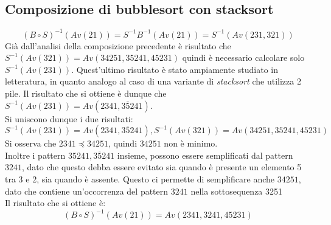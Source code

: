 \subsection{Composizione di {bubblesort} con {stacksort}}
$$(B\circ S)^{-1}(Av(21))=S^{-1}B^{-1}(Av(21))=S^{-1}(Av(231,321))$$
Gi\`a dall'analisi della composizione precedente \`e risultato che $S^{-1}(Av(321))=Av(34251, 35241, 45231)$ quindi \`e necessario calcolare solo $S^{-1}(Av(231))$. Quest'ultimo risultato \`e stato ampiamente studiato in letteratura, in quanto analogo al caso di una variante di \textit{stacksort} che utilizza 2 pile. Il risultato che si ottiene \`e dunque che $S^{-1}(Av(231))=Av(2341, 3\overline{5}241)$\cite{claesson2012sorting}.\\
Si uniscono dunque i due risultati:
$$S^{-1}(Av(231))=Av(2341,3\overline{5}241), S^{-1}(Av(321))=Av(34251, 35241, 45231)$$
Si osserva che $2341\preceq 34251$, quindi $34251$ non \`e minimo.\\
Inoltre i pattern $35241, 3\overline{5}241$ insieme, possono essere semplificati dal pattern $3241$, dato che questo debba essere evitato sia quando \`e presente un elemento 5 tra 3 e 2, sia quando \`e assente. Questo ci permette di semplificare anche $34251$, dato che contiene un'occorrenza del pattern $3241$ nella sottosequenza 3251\\
Il risultato che si ottiene \`e:
$$(B\circ S)^{-1}(Av(21))=Av(2341,3241,45231)$$
